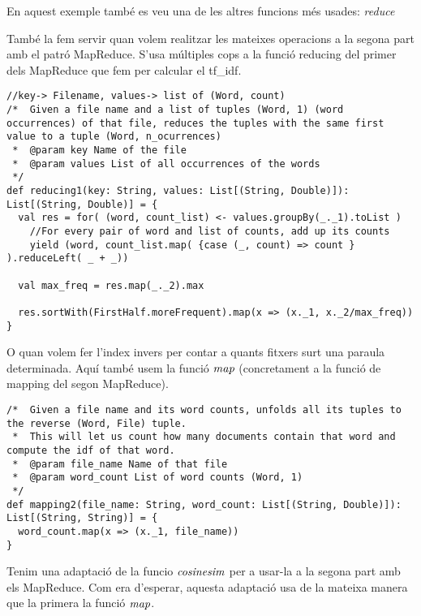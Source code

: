 \documentclass{report}
\begin{document}
En aquest exemple també es veu una de les altres funcions més usades: \emph{ reduce }

\newpage

També la fem servir quan volem realitzar les mateixes operacions a la segona part amb el patró MapReduce. S'usa múltiples cops a la funció reducing del primer dels MapReduce que fem per calcular el tf\_idf.

\begin{lstlisting}[style=scalaHighlight]
//key-> Filename, values-> list of (Word, count)
/* 	Given a file name and a list of tuples (Word, 1) (word occurrences) of that file, reduces the tuples with the same first value to a tuple (Word, n_ocurrences)
 * 	@param key Name of the file
 * 	@param values List of all occurrences of the words
 */
def reducing1(key: String, values: List[(String, Double)]): List[(String, Double)] = {
  val res = for( (word, count_list) <- values.groupBy(_._1).toList )
    //For every pair of word and list of counts, add up its counts
    yield (word, count_list.map( {case (_, count) => count } ).reduceLeft( _ + _))

  val max_freq = res.map(_._2).max

  res.sortWith(FirstHalf.moreFrequent).map(x => (x._1, x._2/max_freq))
}
\end{lstlisting}

O quan volem fer l'index invers per contar a quants fitxers surt una paraula determinada. Aquí també usem la funció $ \emph{map}$ (concretament a la funció de mapping del segon MapReduce).

\begin{lstlisting}[style=scalaHighlight]
/*	Given a file name and its word counts, unfolds all its tuples to the reverse (Word, File) tuple.
 * 	This will let us count how many documents contain that word and compute the idf of that word.
 * 	@param file_name Name of that file
 * 	@param word_count List of word counts (Word, 1)
 */
def mapping2(file_name: String, word_count: List[(String, Double)]): List[(String, String)] = {
  word_count.map(x => (x._1, file_name))
}
\end{lstlisting}

\newpage

Tenim una adaptació de la funcio $ \emph{cosinesim} $ per a usar-la a la segona part amb els MapReduce. Com era d'esperar, aquesta adaptació usa de la mateixa manera que la primera la funció $ \emph{map} $.
\end{document}
